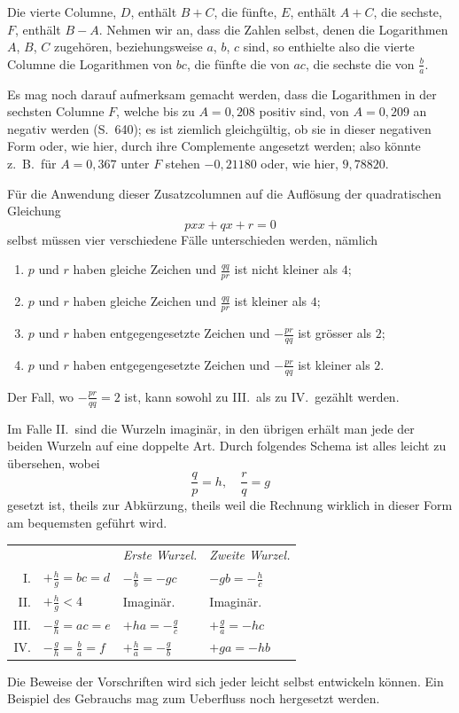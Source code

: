 Die vierte Columne, $D$, enthält $B+C$, die fünfte, $E$, enthält $A+C$,
die sechste, $F$, enthält $B-A$. Nehmen wir an, dass die Zahlen selbst, denen
die Logarithmen $A$, $B$, $C$ zugehören, beziehungsweise $a$, $b$, $c$ sind, so enthielte
also die vierte Columne die Logarithmen von $bc$, die fünfte die von $ac$, die
sechste die von $\frac{b}{a}$.

Es mag noch darauf aufmerksam gemacht werden, dass die Logarithmen in
der sechsten Columne $F$, welche bis zu $A=0{,}208$ positiv sind, von $A=0{,}209$
an negativ werden (S.\ 640); es ist ziemlich gleichgültig, ob sie in dieser negativen Form oder, wie hier, durch ihre Complemente angesetzt werden; also könnte
z.\ B.\ für $A=0{,}367$ unter $F$ stehen $-0{,}21180$ oder, wie hier, $9{,}78820$.

Für die Anwendung dieser Zusatzcolumnen auf die Auflösung der quadratischen Gleichung
\[
pxx+qx+r=0
\]
selbst müssen vier verschiedene Fälle unterschieden werden, nämlich
\begin{enumerate}
\item[I.] $p$ und $r$ haben gleiche Zeichen und $\frac{qq}{pr}$ ist nicht kleiner als $4$;
\item[II.] $p$ und $r$ haben gleiche Zeichen und $\frac{qq}{pr}$ ist kleiner als $4$;
\item[III.] $p$ und $r$ haben entgegengesetzte Zeichen und $-\frac{pr}{qq}$ ist grösser als $2$;
\item[IV.] $p$ und $r$ haben entgegengesetzte Zeichen und $-\frac{pr}{qq}$ ist kleiner als $2$.
\end{enumerate}
Der Fall, wo $-\frac{pr}{qq}=2$ ist, kann sowohl zu III.\ als zu IV.\ gezählt werden.

Im Falle II.\ sind die Wurzeln imaginär, in den übrigen erhält man jede der
beiden Wurzeln auf eine doppelte Art. Durch folgendes Schema ist alles leicht
zu übersehen, wobei
\[
\frac{q}{p}=h,\quad \frac{r}{q}=g
\]
gesetzt ist, theils zur Abkürzung, theils weil die Rechnung wirklich in dieser
Form am bequemsten geführt wird.

\begin{center}
\begingroup\renewcommand{\arraystretch}{1.7}\begin{tabular}{rlll}
 & & \emph{Erste Wurzel.} & \emph{Zweite Wurzel.} \\
I. & $+\frac{h}{g}=bc=d$ & $-\frac{h}{b}=-gc$ & $-gb=-\frac{h}{c}$ \\
II. & $+\frac{h}{g}<4$ & Imaginär. & Imaginär. \\
III. & $-\frac{g}{h}=ac=e$ & $+ha=-\frac{g}{c}$ & $+\frac{g}{a}=-hc$ \\
IV. & $-\frac{g}{h}=\frac{b}{a}=f$ & $+\frac{h}{a}=-\frac{g}{b}$ & $+ga=-hb$
\end{tabular}\endgroup
\end{center}
\par
{}
Die Beweise der Vorschriften wird sich jeder leicht selbst entwickeln können. Ein Beispiel des Gebrauchs mag zum Ueberfluss noch hergesetzt werden.

